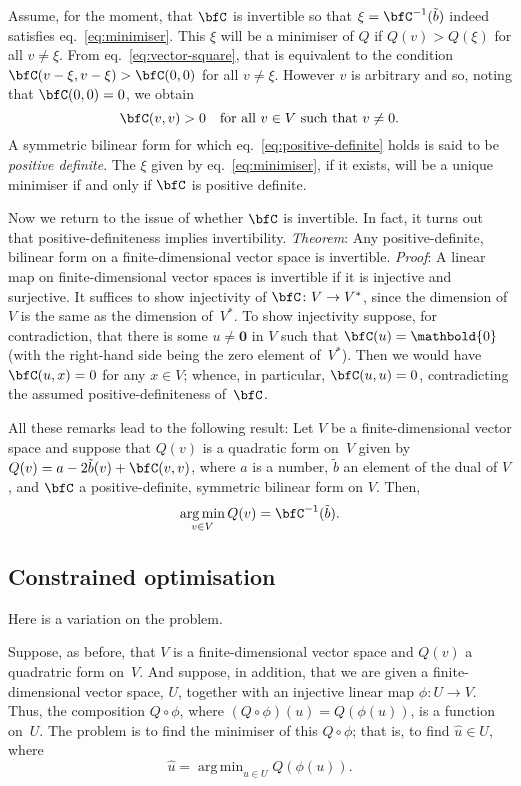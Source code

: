 \documentclass[10pt, a4paper]{article}
\newcommand{\bzero}{\mathbold{0}} %
\DeclareMathOperator*{\argmin}{arg\,min}
\begin{document}
Assume, for the moment, that $\bfC$ is invertible so that
$\xi=\bfC^{-1}(\tilde{b})$ indeed satisfies
eq.~\eqref{eq:minimiser}. This $\xi$ will be a minimiser of $Q$ if
$Q(v)>Q(\xi)$ for all $v \neq \xi$. From eq.~\eqref{eq:vector-square}, that
is equivalent to the condition $\bfC(v-\xi,v-\xi)>\bfC(0,0)$ for all
$v\neq\xi$. However $v$ is arbitrary and so, noting that
$\bfC(0,0)=0$, we obtain
\begin{equation}
  \bfC(v,v) > 0 \quad\text{for all $v\in V$ such that $v\neq0$}.
  \label{eq:positive-definite}
\end{equation}
A symmetric bilinear form for which eq.~\eqref{eq:positive-definite}
holds is said to be \emph{positive definite}. The $\xi$ given by
eq.~\eqref{eq:minimiser}, if it exists, will be a unique minimiser if
and only if $\bfC$ is positive definite.

Now we return to the issue of whether $\bfC$ is invertible. In fact,
it turns out that positive-definiteness implies
invertibility. \emph{Theorem}: Any positive-definite, bilinear form on
a finite-dimensional vector space is invertible. \emph{Proof}: A
linear map on finite-dimensional vector spaces is invertible if it is
injective and surjective. It suffices to show injectivity of
$\bfC\colon V\to V^*$, since the dimension of $V$ is the same as the
dimension of~$V^*$. To show injectivity suppose, for contradiction,
that there is some $u\neq\bzero$ in $V$ such that $\bfC(u)=\bzero$ (with
the right-hand side being the zero element of~$V^*$). Then we would
have $\bfC(u, x) = 0$ for any $x\in V$; whence, in particular,
$\bfC(u,u)=0$, contradicting the assumed positive-definiteness
of~$\bfC$.

All these remarks lead to the following result: Let $V$ be a
finite-dimensional vector space and suppose that $Q(v)$ is a quadratic
form on~$V$ given by $Q(v)=a -2\tilde{b}(v) + \bfC(v,v)$, where
$a$ is a number, $\tilde{b}$ an element of the dual of $V$, and
$\bfC$ a positive-definite, symmetric bilinear form on $V$. Then,
\begin{equation}
  \argmin_{v\in V} Q(v) = \bfC^{-1}(\tilde{b}).
  \label{eq:quadratic-minimiser}
\end{equation}

\subsection*{Constrained optimisation}
Here is a variation on the problem.

Suppose, as before, that $V$ is a finite-dimensional vector space and
$Q(v)$ a quadratric form on~$V$. And suppose, in addition, that we are
given a finite-dimensional vector space, $U$, together with an
injective linear map $\phi:U\to V$. Thus, the composition
$Q\circ\phi$, where $(Q\circ\phi)(u)=Q(\phi(u))$, is a function
on~$U$. The problem is to find the minimiser of this $Q\circ\phi$; that is,
to find $\hat{u}\in U$, where
\begin{equation}
  \hat{u} = \argmin_{u\in U} Q(\phi(u)).
\end{equation}
\end{document}

